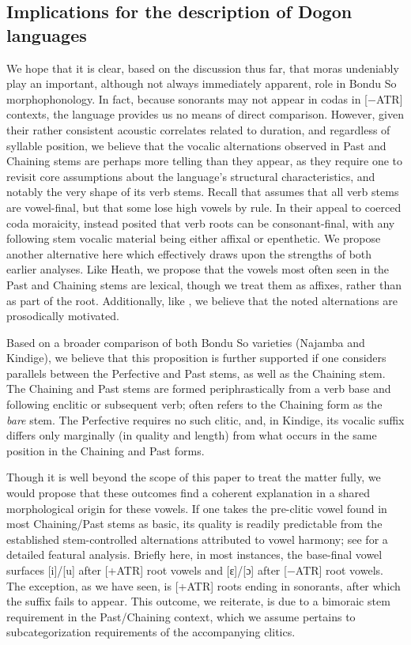 \documentclass[output=paper,colorlinks,citecolor=brown]{langscibook}
\begin{document}
\subsection{Implications for the description of Dogon languages}
\label{subsec-imp-Dog}

We hope that it is clear, based on the discussion thus far, that moras undeniably play an important, although not always immediately apparent, role in Bondu So morphophonology. In fact, because sonorants may not appear in codas in [−ATR] contexts, the language provides us no means of direct comparison. However, given their rather consistent acoustic correlates related to  duration, and regardless of syllable position, we believe that the vocalic alternations observed in Past and Chaining stems are perhaps more telling than they appear, as they require one to revisit core assumptions about the language's structural characteristics, and notably the very shape of its verb stems. Recall that \citet{HeathBS2017} assumes that all verb stems are vowel-final, but that some lose high vowels by rule. In their appeal to coerced coda moraicity, \citet{GreenHantgan} instead posited that verb roots can be consonant-final, with any following stem vocalic material being either affixal or epenthetic. We propose another alternative here which effectively draws upon the strengths of both earlier analyses. Like Heath, we propose that the vowels most often seen in the Past and Chaining stems are lexical, though we treat them as affixes, rather than as part of the root. Additionally, like \citet{ GreenHantgan}, we believe that the noted alternations are prosodically motivated.

Based on a broader comparison of both Bondu So varieties (Najamba and Kindige), we believe that this proposition is further supported if one considers parallels between the Perfective and Past stems, as well as the Chaining stem. The Chaining and Past stems are formed periphrastically from a verb base and following enclitic or subsequent verb; \citet{HeathBS2017} often refers to the Chaining form as the \textit{bare} stem. The Perfective requires no such clitic, and, in Kindige, its vocalic suffix differs only marginally (in quality and length) from what occurs in the same position in the Chaining and Past forms.

Though it is well beyond the scope of this paper to treat the matter fully, we would propose that these outcomes find a coherent explanation in a shared morphological origin for these vowels. If one takes the pre-clitic vowel found in most Chaining/Past stems as basic, its quality is readily predictable from the established stem-controlled alternations attributed to vowel harmony; see \citet{GreenHantgan} for a detailed featural analysis. Briefly here, in most instances, the base-final vowel surfaces [i]/[u] after [+ATR] root vowels and [ɛ]/[ɔ] after [−ATR] root vowels. The exception, as we have seen, is [+ATR] roots ending in sonorants, after which the suffix fails to appear. This outcome, we reiterate, is due to a bimoraic stem requirement in the Past/Chaining context, which we assume pertains to subcategorization requirements of the accompanying clitics.
\end{document}
